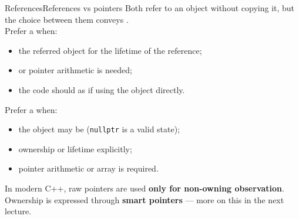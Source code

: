 \begin{frame}{References}{References vs pointers}
	\justifying
	Both refer to an object without copying it, but the choice between them conveys .\\
	Prefer a  when:
	\begin{itemize}
		\item the referred object  for the lifetime of the reference;
		\item {} or pointer arithmetic is needed;
		\item the code should  as if using the object directly.
	\end{itemize}
	\medskip
	Prefer a  when:
	\begin{itemize}
		\item the object may be  (\texttt{nullptr} is a valid state);
		\item ownership or lifetime  explicitly;
		\item pointer arithmetic or array  is required.
	\end{itemize}
	\begin{block}{}
		\centering
		In modern C++, raw pointers are used \textbf{only for non-owning observation}.\\
		Ownership is expressed through \textbf{smart pointers} — more on this in the next lecture.
	\end{block}
\end{frame}
